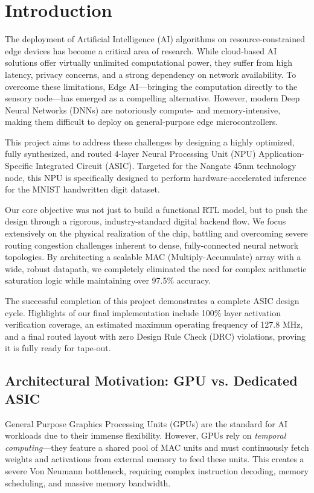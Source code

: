 \section{Introduction}
\label{sec:introduction}

The deployment of Artificial Intelligence (AI) algorithms on resource-constrained edge devices has become a critical area of research. While cloud-based AI solutions offer virtually unlimited computational power, they suffer from high latency, privacy concerns, and a strong dependency on network availability. To overcome these limitations, Edge AI—bringing the computation directly to the sensory node—has emerged as a compelling alternative. However, modern Deep Neural Networks (DNNs) are notoriously compute- and memory-intensive, making them difficult to deploy on general-purpose edge microcontrollers. 

This project aims to address these challenges by designing a highly optimized, fully synthesized, and routed 4-layer Neural Processing Unit (NPU) Application-Specific Integrated Circuit (ASIC). Targeted for the Nangate 45nm technology node, this NPU is specifically designed to perform hardware-accelerated inference for the MNIST handwritten digit dataset. 

Our core objective was not just to build a functional RTL model, but to push the design through a rigorous, industry-standard digital backend flow. We focus extensively on the physical realization of the chip, battling and overcoming severe routing congestion challenges inherent to dense, fully-connected neural network topologies. By architecting a scalable MAC (Multiply-Accumulate) array with a wide, robust datapath, we completely eliminated the need for complex arithmetic saturation logic while maintaining over 97.5\% accuracy. 

The successful completion of this project demonstrates a complete ASIC design cycle. Highlights of our final implementation include 100\% layer activation verification coverage, an estimated maximum operating frequency of 127.8 MHz, and a final routed layout with zero Design Rule Check (DRC) violations, proving it is fully ready for tape-out.

\subsection{Architectural Motivation: GPU vs. Dedicated ASIC}
General Purpose Graphics Processing Units (GPUs) are the standard for AI workloads due to their immense flexibility. However, GPUs rely on \textit{temporal computing}—they feature a shared pool of MAC units and must continuously fetch weights and activations from external memory to feed these units. This creates a severe Von Neumann bottleneck, requiring complex instruction decoding, memory scheduling, and massive memory bandwidth. 

